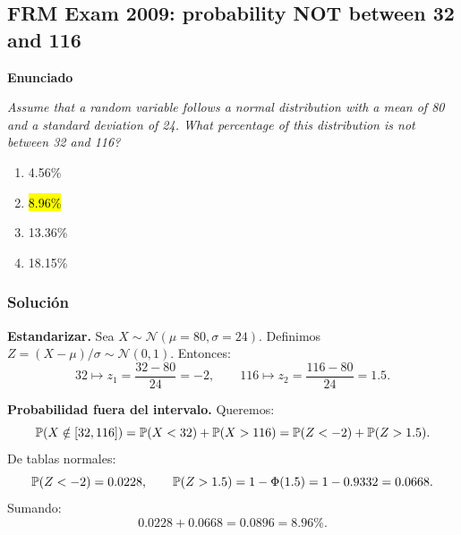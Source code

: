 ﻿\subsection{FRM Exam 2009: probability NOT between 32 and 116}

\textbf{Enunciado}

\emph{Assume that a random variable follows a normal distribution with a mean of 80 and a standard deviation of 24. What percentage of this distribution is not between 32 and 116?}
\begin{enumerate}[label=\alph*.]
\item 4.56\%
\item \hl{8.96\%}
\item 13.36\%
\item 18.15\%
\end{enumerate}

\subsubsection*{Solución}


\textbf{Estandarizar. }Sea \(X\sim\mathcal N(\mu=80,\sigma=24)\). Definimos \(Z=(X-\mu)/\sigma\sim\mathcal N(0,1)\).
Entonces:
\[
32 \mapsto z_1=\frac{32-80}{24}=-2,\qquad
116 \mapsto z_2=\frac{116-80}{24}=1.5.
\]

\textbf{Probabilidad fuera del intervalo. }Queremos:
\[
\mathbb{P}(X\notin[32,116])=\mathbb{P}(X<32)+\mathbb{P}(X>116)=\mathbb{P}(Z<-2)+\mathbb{P}(Z>1.5).
\]
De tablas normales:
\[
\mathbb{P}(Z<-2)=0.0228,\qquad \mathbb{P}(Z>1.5)=1-\Phi(1.5)=1-0.9332=0.0668.
\]
Sumando:
\[
0.0228+0.0668=0.0896=8.96\%.
\]











